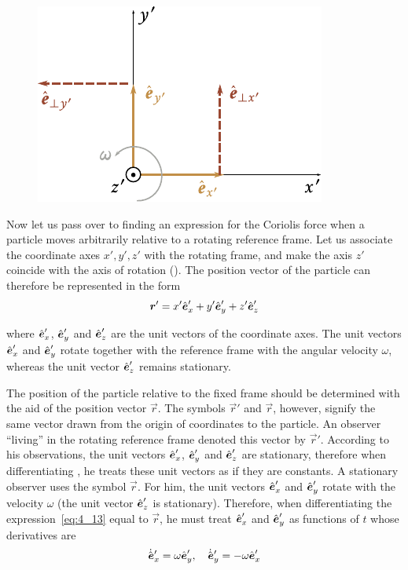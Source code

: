 \begin{figure}[t]
	\begin{center}
		\includegraphics[scale=1]{figures/ch_04/fig_4_8.pdf}
		\caption[]{}
		\label{fig:4_8}
	\end{center}
	\vspace{-0.8cm}
\end{figure}

Now let us pass over to finding an expression for the Coriolis force when a particle moves arbitrarily relative to a rotating reference frame. Let us associate the coordinate axes $x', y', z'$ with the rotating frame, and make the axis $z'$ coincide with the axis of rotation (). The position vector of the particle can therefore be represented in the form
\begin{equation}\label{eq:4_13}
\boldsymbol{r}' = x'\hat{\boldsymbol{e}}_{x}' + y'\hat{\boldsymbol{e}}_{y}' + z'\hat{\boldsymbol{e}}_{z}'
\end{equation}

\noindent
where $\hat{\boldsymbol{e}}_{x}'$, $\hat{\boldsymbol{e}}_{y}'$ and $\hat{\boldsymbol{e}}_{z}'$ are the unit vectors of the coordinate axes. The unit vectors $\hat{\boldsymbol{e}}_{x}'$ and $\hat{\boldsymbol{e}}_{y}'$ rotate together with the reference frame with the angular velocity $\omega$, whereas the unit vector $\hat{\boldsymbol{e}}_{z}'$ remains stationary.

The position of the particle relative to the fixed frame should be determined with the aid of the position vector $\vec{r}$. The symbols $\vec{r}'$ and $\vec{r}$, however, signify the same vector drawn from the origin of coordinates to the particle. An observer ``living'' in the rotating reference frame denoted this vector by $\vec{r}'$. According to his observations, the unit vectors $\hat{\boldsymbol{e}}_{x}'$, $\hat{\boldsymbol{e}}_{y}'$ and $\hat{\boldsymbol{e}}_{z}'$ are stationary, therefore when differentiating , he treats these unit vectors as if they are constants. A stationary observer uses the symbol $\vec{r}$. For him, the unit vectors $\hat{\boldsymbol{e}}_{x}'$ and $\hat{\boldsymbol{e}}_{y}'$ rotate with the velocity $\omega$ (the unit vector $\hat{\boldsymbol{e}}_{z}'$ is stationary). Therefore, when differentiating the expression~\eqref{eq:4_13} equal to $\vec{r}$, he must treat $\hat{\boldsymbol{e}}_{x}'$ and $\hat{\boldsymbol{e}}_{y}'$ as functions of $t$ whose derivatives are
\begin{equation}\label{eq:4_14}
\dot{\hat{\boldsymbol{e}}}_x' = \omega\hat{\boldsymbol{e}}_{y}',\quad \dot{\hat{\boldsymbol{e}}}_y' = -\omega\hat{\boldsymbol{e}}_{x}'
\end{equation}

